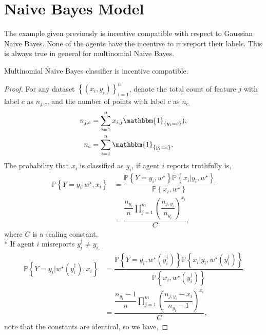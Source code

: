 \documentclass{article}
\begin{document}
\section{Naive Bayes Model} 
The example given previously is incentive compatible with respect to Gaussian Naive Bayes. None of the agents have the incentive to misreport their labels. This is always true in general for multinomial Naive Bayes.
\newline \newline
\begin{prop} \label{prop:mnb} 
Multinomial Naive Bayes classifier is incentive compatible.
\end{prop}
\begin{proof} \label{proof:mnbpf} 
For any dataset $\left\{\left(x_{i}, y_{i}\right)\right\}_{i=1}^{n}$, denote the total count of feature $j $ with label $c $ as $n_{j,c}$, and the number of points with label $c $ as $n_{c.}$
\begin{align*}
n_{j,c} &= \displaystyle\sum_{i=1}^{n} x_{i,j} \mathbbm{1}_{\left\{y_{i} = c\right\}}),
\\ n_{c} &= \displaystyle\sum_{i=1}^{n} \mathbbm{1}_{\left\{y_{i} = c\right\}}.
\end{align*}
The probability that $x_{i}$ is classified as $y_{i}$, if agent $i $ reports truthfully is,
\begin{align*}
\mathbb{P} \left\{Y = y_{i} | w^\star , x_{i}\right\} &= \dfrac{\mathbb{P} \left\{Y = y_{i}, w^\star \right\} \mathbb{P} \left\{ x_{i} | y_{i}, w^\star \right\}}{\mathbb{P}\left\{ x_{i}, w^\star  \right\}}
\\ &= \dfrac{\dfrac{n_{y_{i}}}{n} \displaystyle\prod_{j=1}^{m} \left(\dfrac{n_{j, y_{i}}}{n_{y_{i}}}\right)^{x_{i}}}{C} ,
\end{align*}
where $C $ is a scaling constant.
\\* If agent $i $ misreports $y^{\dagger}_{i} \neq  y_{i,}$
\begin{align*}
\mathbb{P} \left\{Y = y_{i} | w^\star \left(y^{\dagger}_{i}\right), x_{i}\right\} &= \dfrac{\mathbb{P} \left\{Y = y_{i}, w^\star \left(y^{\dagger}_{i}\right)\right\} \mathbb{P} \left\{ x_{i} | y_{i}, w^\star \left(y^{\dagger}_{i}\right)\right\}}{\mathbb{P}\left\{ x_{i}, w^\star \left(y^{\dagger}_{i}\right) \right\}}
\\ &= \dfrac{\dfrac{n_{y_{i}} - 1}{n} \displaystyle\prod_{j=1}^{m} \left(\dfrac{n_{j, y_{i}} - x_{i}}{n_{y_{i}} - 1}\right)^{x_{i}}}{C} ,
\end{align*}
note that the constants are identical, so we have,

\end{proof}
\end{document}
